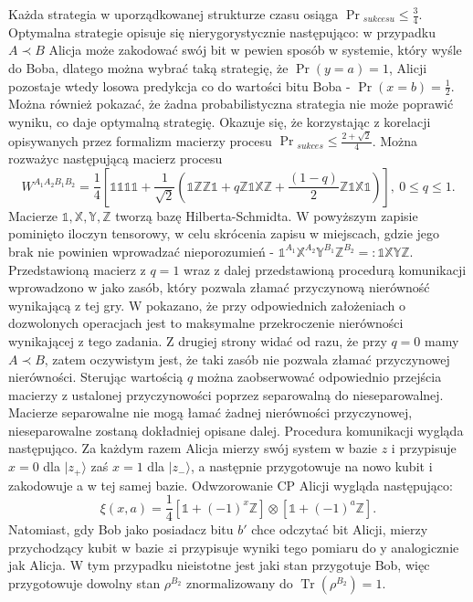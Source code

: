 \documentclass[10pt]{article} %
\DeclareMathOperator{\Trs}{Tr}
\newcommand{\Ket}[1]{|#1\rangle}
\newcommand{\WAll}{W^{A_1A_2B_1B_2}}
\newcommand{\X}{\mathbb{X}}
\newcommand{\Y}{\mathbb{Y}}
\newcommand{\Z}{\mathbb{Z}}
\newcommand{\I}{\mathbb{1}}
\begin{document}
Każda strategia w uporządkowanej strukturze czasu osiąga $\Pr{}_{sukcesu} \leq \frac{3}{4}$. Optymalna strategie opisuje się nierygorystycznie następująco: w przypadku $A \prec B$ Alicja może zakodować swój bit w pewien sposób w systemie, który wyśle do Boba, dlatego można wybrać taką strategię, że $\Pr(y=a) = 1$, Alicji pozostaje wtedy losowa predykcja co do wartości bitu Boba - $\Pr(x=b) = \frac{1}{2}$. Można również pokazać, że żadna probabilistyczna strategia nie może poprawić wyniku, co daje optymalną strategię. Okazuje się, że korzystając z korelacji opisywanych przez formalizm macierzy procesu $\Pr{}_{sukces} \leq \frac{2+\sqrt{2}}{4}$.
Można rozważyc następującą macierz procesu
\begin{equation}
\WAll = \frac{1}{4}\left[
\I\I\I\I + \frac{1}{\sqrt{2}}(\I\Z\Z\I + q\Z\I\X\Z + \frac{(1-q)}{2}\Z\I\X\I)
\right],~ 0 \leq q \leq 1.
\end{equation}
Macierze $\I, \X, \Y, \Z$ tworzą bazę Hilberta-Schmidta. W powyższym zapisie pominięto iloczyn tensorowy, w celu skrócenia zapisu w miejscach, gdzie jego brak nie powinien wprowadzać nieporozumień - $\I^{A_1}\X^{A_2}\Y^{B_1}\Z^{B_2} =: \I\X\Y\Z$.
Przedstawioną macierz z $q=1$ wraz z dalej przedstawioną procedurą komunikacji wprowadzono w \cite{process_matrix} jako zasób, który pozwala złamać przyczynową nierówność wynikającą z tej gry. W \cite{max_violation} pokazano, że przy odpowiednich założeniach o dozwolonych operacjach jest to maksymalne przekroczenie nierówności
wynikającej z tego zadania. Z drugiej strony widać od razu, że przy $q=0$ mamy $A \prec B$, zatem oczywistym jest, że taki zasób nie pozwala złamać przyczynowej nierówności. Sterując wartością $q$ można zaobserwować odpowiednio przejścia macierzy z ustalonej przyczynowości poprzez separowalną do nieseparowalnej.
Macierze separowalne nie mogą łamać żadnej nierówności przyczynowej, nieseparowalne zostaną dokładniej opisane dalej. Procedura komunikacji wygląda następująco. 
Za każdym razem Alicja mierzy swój system w bazie $z$ i przypisuje $x = 0$ dla $\Ket{z_+}$ zaś $x=1$ dla $\Ket{z_-}$, a następnie przygotowuje na nowo kubit i zakodowuje a w tej samej bazie. Odwzorowanie CP Alicji wygląda następująco:
\begin{equation}
\xi(x, a) = \frac{1}{4}
\left[
\I + (-1)^x \Z
\right]
\otimes
\left[
\I  + (-1)^a \Z
\right	].
\end{equation}
Natomiast, gdy Bob jako posiadacz bitu $b'$ chce odczytać bit Alicji, mierzy przychodzący kubit w bazie $z$i przypisuje wyniki tego pomiaru do y analogicznie jak Alicja. W tym przypadku nieistotne jest jaki stan przygotuje Bob, więc przygotowuje dowolny stan $\rho^{B_2}$ znormalizowany do $\Trs (\rho^{B_2}) = 1$.
\end{document}
